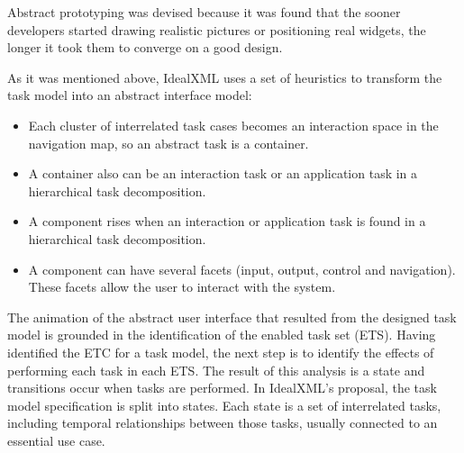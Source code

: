 Abstract prototyping was devised because it was found that the sooner developers started drawing realistic pictures or positioning real widgets, the longer it took them to converge on a good design.

As it was mentioned above, IdealXML uses a set of heuristics to transform the task model into an abstract interface model:
\begin{itemize}
\item Each cluster of interrelated task cases becomes an interaction space in the navigation map, so an abstract task is a container.
\item A container also can be an interaction task or an application task in a hierarchical task decomposition.
\item A component rises when an interaction or application task is found in a hierarchical task decomposition.
\item A component can have several facets (input, output, control and navigation). These facets allow the user to interact with the system.
\end{itemize}

The animation of the abstract user interface that resulted from the designed task model is grounded in the identification of the enabled task set (ETS). Having identified the ETC for a task model, the next step is to identify the effects of performing each task in each ETS. The result of this analysis is  a state and transitions occur when tasks are performed. In IdealXML's proposal, the task model specification is split into states. Each state is a set of interrelated tasks, including temporal relationships between those tasks, usually connected to an essential use case.